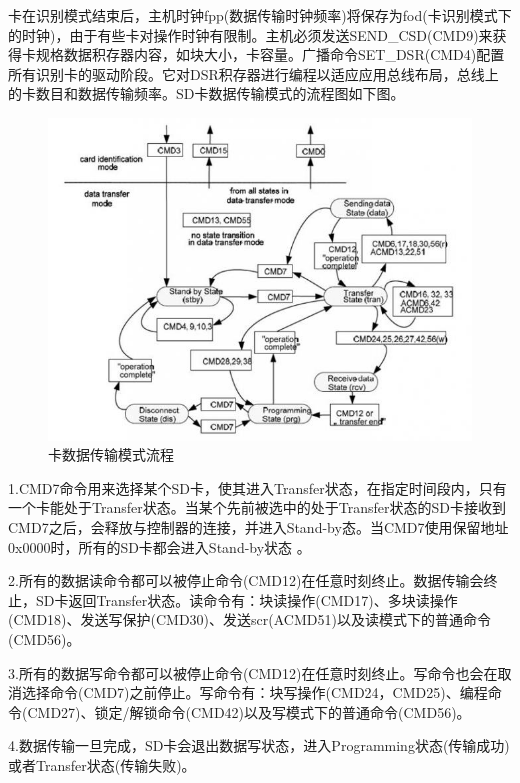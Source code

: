 卡在识别模式结束后，主机时钟fpp(数据传输时钟频率)将保存为fod(卡识别模式下的时钟)，由于有些卡对操作时钟有限制。主机必须发送SEND_CSD(CMD9)来获得卡规格数据积存器内容，如块大小，卡容量。广播命令SET_DSR(CMD4)配置所有识别卡的驱动阶段。它对DSR积存器进行编程以适应应用总线布局，总线上的卡数目和数据传输频率。SD卡数据传输模式的流程图如下图。
\begin{figure}[H]
    \centering
    \includegraphics{figures/06-02-数据传输.png}
    \caption{卡数据传输模式流程}
\end{figure}

1.CMD7命令用来选择某个SD卡，使其进入Transfer状态，在指定时间段内，只有一个卡能处于Transfer状态。当某个先前被选中的处于Transfer状态的SD卡接收到CMD7之后，会释放与控制器的连接，并进入Stand-by态。当CMD7使用保留地址0x0000时，所有的SD卡都会进入Stand-by状态 。


2.所有的数据读命令都可以被停止命令(CMD12)在任意时刻终止。数据传输会终止，SD卡返回Transfer状态。读命令有：块读操作(CMD17)、多块读操作(CMD18)、发送写保护(CMD30)、发送scr(ACMD51)以及读模式下的普通命令(CMD56)。

3.所有的数据写命令都可以被停止命令(CMD12)在任意时刻终止。写命令也会在取消选择命令(CMD7)之前停止。写命令有：块写操作(CMD24，CMD25)、编程命令(CMD27)、锁定/解锁命令(CMD42)以及写模式下的普通命令(CMD56)。

4.数据传输一旦完成，SD卡会退出数据写状态，进入Programming状态(传输成功)或者Transfer状态(传输失败)。
